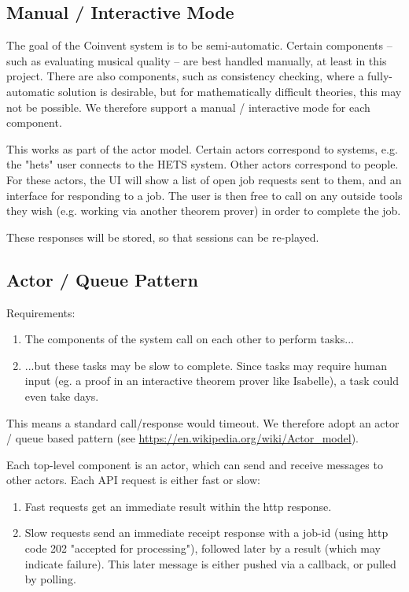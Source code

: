 \subsection{Manual / Interactive Mode}

The goal of the Coinvent system is to be semi-automatic. 
Certain components -- such as evaluating musical quality -- are best handled manually, at least
in this project. There are also components, such as consistency checking, where a fully-automatic solution is desirable, but for mathematically difficult theories, this may not be possible.
We therefore support a manual / interactive mode for each component.

This works as part of the actor model. Certain actors correspond to systems, e.g. the "hets" user
connects to the HETS system. Other actors correspond to people. For these actors, the UI
will show a list of open job requests sent to them, and an interface for responding to a job.
The user is then free to call on any outside tools they wish (e.g. working via another theorem prover)
in order to complete the job.

These responses will be stored, so that sessions can be re-played.

\subsection{Actor / Queue Pattern}


Requirements:  
\begin{enumerate}
\item The components of the system call on each other to perform tasks...
\item ...but these tasks may be slow to complete. Since tasks may require human input (eg. a proof in an interactive theorem prover like Isabelle), a task
could even take days.
\end{enumerate}
This means a standard call/response would timeout. We therefore adopt an actor / queue based pattern (see \url{https://en.wikipedia.org/wiki/Actor_model}). 

Each top-level component is an actor, which can send and receive messages to other actors. Each API request is either fast or slow:
\begin{enumerate}
 \item Fast requests get an immediate result within the http response.
 \item Slow requests send an immediate receipt response with a job-id (using http code 202 "accepted for processing"), followed later by a result (which may indicate failure). This later message is either pushed via a callback, or pulled by polling.
\end{enumerate}

